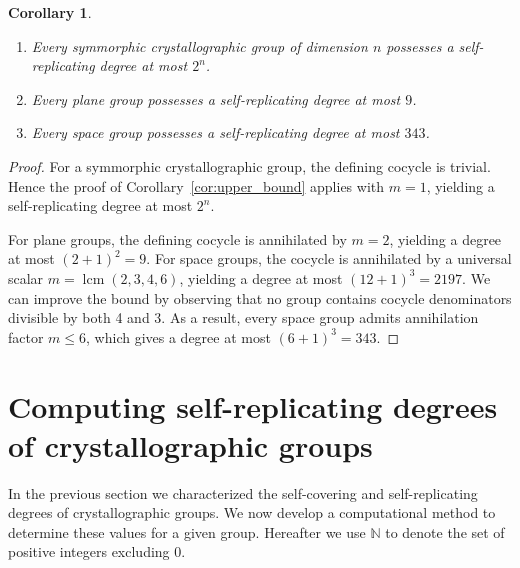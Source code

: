 \documentclass[draft]{adm-paper}
\newtheorem{corollary}[theorem]{Corollary}
\theoremstyle{definition}
\begin{document}
\begin{corollary}
  \begin{enumerate}
    \item Every symmorphic crystallographic group of dimension $n$ possesses a self-replicating degree at most $2^n$.
    \item Every plane group possesses a self-replicating degree at most $9$.
    \item Every space group possesses a self-replicating degree at most $343$.
  \end{enumerate}
\end{corollary}
\begin{proof}
For a symmorphic crystallographic group, the defining cocycle is trivial. Hence the proof of
Corollary~\ref{cor:upper_bound} applies with $m=1$, yielding a self-replicating degree at most $2^n$.

For plane groups, the defining cocycle is annihilated by $m=2$, yielding a degree at most $(2+1)^2 = 9$. For space
groups, the cocycle is annihilated by a universal scalar $m=\operatorname{lcm}(2, 3, 4, 6)$, yielding a degree at most $(12+1)^3 =
2197$. We can improve the bound by observing that no group contains cocycle denominators divisible by both 4 and 3.
As a result, every space group admits annihilation factor $m \le 6$, which gives a degree at most $(6 + 1)^3 = 343$.
\end{proof}



\section{Computing self-replicating degrees of crystallographic groups}\label{sec:computations}

In the previous section we characterized the self-covering and self-repli\-cating degrees of crystallographic groups. We
now develop a computational method to determine these values for a given group. Hereafter we use $\mathbb{N}$ to denote
the set of positive integers excluding 0.

\end{document}
